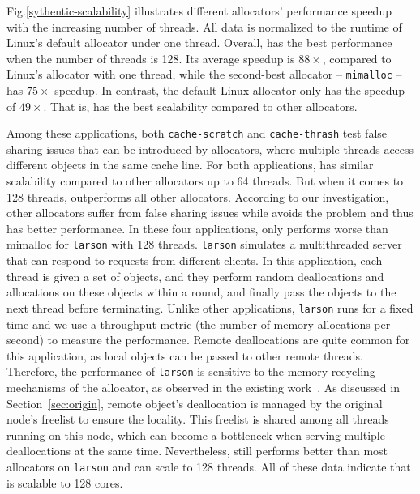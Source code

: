 Fig.\ref{sythentic-scalability} illustrates different allocators' performance speedup with the increasing number of threads. All data is normalized to the runtime of Linux's default allocator under one thread. Overall, \NM{} has the best performance when the number of threads is 128. Its average speedup is $88\times$, compared to Linux's allocator with one thread, while the second-best allocator -- \texttt{mimalloc} -- has $75\times$ speedup. In contrast, the default Linux allocator only has the speedup of $49\times$. That is, \NM{} has the best scalability compared to other allocators.

Among these applications, both \texttt{cache-scratch} and \texttt{cache-thrash} test false sharing issues that can be introduced by allocators, where multiple threads access different objects in the same cache line. For both applications, \NM{} has similar scalability compared to other allocators up to 64 threads. But when it comes to 128 threads, \NM{} outperforms all other allocators. According to our investigation, other allocators suffer from false sharing issues while \NM{} avoids the problem and thus has better performance.
In these four applications, \NM{} only performs worse than mimalloc for \texttt{larson} with 128 threads. \texttt{larson} simulates a multithreaded server that can respond to requests from different clients. In this application, each thread is given a set of objects, and they perform random deallocations and allocations on these objects within a round, and finally pass the objects to the next thread before terminating. Unlike other applications, \texttt{larson} runs for a fixed time and we use a throughput metric (the number of memory allocations per second) to measure the performance. Remote deallocations are quite common for this application, as local objects can be passed to other remote threads. Therefore, the performance of \texttt{larson} is sensitive to the memory recycling mechanisms of the allocator, as observed in the existing work~\cite{Scalloc, scalableallocator}. As discussed in Section~\ref{sec:origin}, remote object's deallocation is managed by the original node's freelist to ensure the locality. This freelist is shared among all threads running on this node, which can become a bottleneck when serving multiple deallocations at the same time. Nevertheless, \NM{} still performs better than most allocators on \texttt{larson} and can scale to 128 threads.
All of these data indicate that \NM{} is scalable to 128 cores. 

